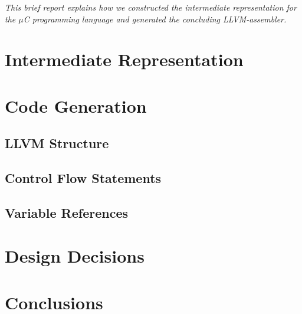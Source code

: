 \textit{This brief report explains how we constructed the intermediate representation for the $\mu$C programming language and generated the concluding LLVM-assembler.}

\section{Intermediate Representation}


\section{Code Generation}


\subsection{LLVM Structure}


\subsection{Control Flow Statements}


\subsection{Variable References}


\section{Design Decisions}



\section{Conclusions}
